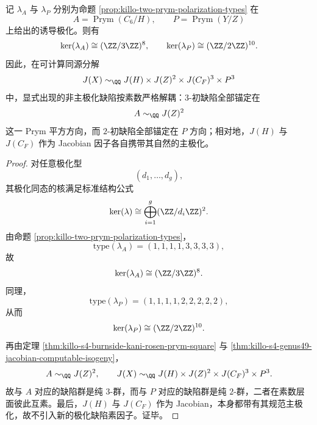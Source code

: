 \begin{conclusion}\label{con:xi-time-part9n-prym-polarization-primary-splitting}
记 \(\lambda_A\) 与 \(\lambda_P\) 分别为命题 \ref{prop:killo-two-prym-polarization-types} 在
\[
A=\operatorname{Prym}(C_6/H),\qquad P=\operatorname{Prym}(Y/Z)
\]
上给出的诱导极化。则有
\[
\ker(\lambda_A)\cong (\ZZ/3\ZZ)^8,
\qquad
\ker(\lambda_P)\cong (\ZZ/2\ZZ)^{10}.
\]
因此，在可计算同源分解
\[
J(X)\sim_{\QQ}J(H)\times J(Z)^2\times J(C_F)^3\times P^3
\]
中，显式出现的非主极化缺陷按素数严格解耦：\(3\)-初缺陷全部锚定在
\[
A\sim_{\QQ}J(Z)^2
\]
这一 Prym 平方方向，而 \(2\)-初缺陷全部锚定在 \(P\) 方向；相对地，\(J(H)\) 与 \(J(C_F)\) 作为 Jacobian 因子各自携带其自然的主极化。
\end{conclusion}
\begin{proof}
对任意极化型
\[
(d_1,\dots,d_g),
\]
其极化同态的核满足标准结构公式
\[
\ker(\lambda)\cong \bigoplus_{i=1}^{g}(\ZZ/d_i\ZZ)^2.
\]
由命题 \ref{prop:killo-two-prym-polarization-types}，
\[
\mathrm{type}(\lambda_A)=(1,1,1,1,3,3,3,3),
\]
故
\[
\ker(\lambda_A)\cong (\ZZ/3\ZZ)^8.
\]
同理，
\[
\mathrm{type}(\lambda_P)=(1,1,1,1,2,2,2,2,2),
\]
从而
\[
\ker(\lambda_P)\cong (\ZZ/2\ZZ)^{10}.
\]
再由定理 \ref{thm:killo-s4-burnside-kani-rosen-prym-square} 与
\ref{thm:killo-s4-genus49-jacobian-computable-isogeny}，
\[
A\sim_{\QQ}J(Z)^2,\qquad
J(X)\sim_{\QQ}J(H)\times J(Z)^2\times J(C_F)^3\times P^3.
\]
故与 \(A\) 对应的缺陷群是纯 \(3\)-群，而与 \(P\) 对应的缺陷群是纯 \(2\)-群，二者在素数层面彼此互素。最后，\(J(H)\) 与 \(J(C_F)\) 作为 Jacobian，本身都带有其规范主极化，故不引入新的极化缺陷素因子。证毕。
\end{proof}

